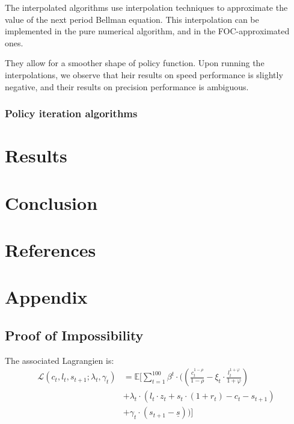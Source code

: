 \documentclass{article}
\begin{document}
The interpolated algorithms use interpolation techniques to approximate 
the value of the next period Bellman equation. 
This interpolation can be implemented in the pure numerical 
algorithm, and in the FOC-approximated ones. 

They allow for a smoother shape of policy function. 
Upon running the interpolations,
we observe that 
heir results on speed performance is slightly negative, 
and their results on precision performance is ambiguous.

\subsubsection{Policy iteration algorithms}


\section{Results}



\section{Conclusion}

\section{References}

\printbibliography

\section{Appendix}


\subsection{Proof of Impossibility}

The associated Lagrangien is: 
\begin{equation}
    \begin{split}
        \mathcal{L}(c_{t},l_{t},s_{t+1};\lambda_t,\gamma_{t}) &
        = \mathbb{E}\Big[\sum_{t=1}^{100} \beta^{t}\cdot ((\frac{c_{t}^{1-\rho}}{1-\rho}-\xi_{t}\cdot\frac{l_{t}^{1+\varphi}}{1+\varphi}) \\
        & +\lambda_{t}\cdot \left(l_{t}\cdot z_{t}+s_{t}\cdot (1+r_{t})-c_{t}-s_{t+1}\right) \\ 
        & + \gamma_{t}\cdot \left(s_{t+1}-\underline{s}\right))\Big] \\ 
    \end{split}
\end{equation}
\end{document}
